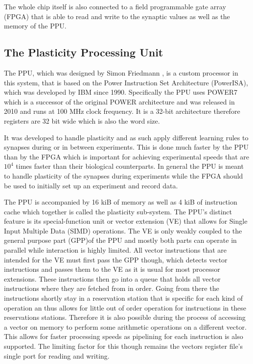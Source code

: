The whole chip itself is also connected to a field programmable gate array (FPGA) that is able to read and write to the synaptic values as well as the memory of the PPU.

\subsection{The Plasticity Processing Unit}
The PPU, which was designed by Simon Friedmann , is a custom processor in this system, that is based on the Power Instruction Set Architecture (PowerISA), which was developed by IBM since 1990. 
Specifically the PPU uses POWER7 which is a successor of the original POWER architecture and was released in 2010 and runs at 100 MHz clock frequency.
It is a 32-bit architecture therefore registers are 32 bit wide which is also the word size.

It was developed to handle plasticity and as such apply different learning rules to synapses during or in between experiments.
This is done much faster by the PPU than by the FPGA which is important for achieving experimental speeds that are $10^{4}$ times faster than their biological counterparts.
In general the PPU is meant to handle plasticity of the synapses during experiments while the FPGA should be used to initially set up an experiment and record data.

The PPU is accompanied by 16 kiB of memory as well as 4 kiB of instruction cache which together is called the plasticity sub-system.
The PPU's distinct feature is its special-function unit or vector extension (VE) that allows for Single Input Multiple Data (SIMD) operations.
The VE is only weakly coupled to the general purpose part (GPP)of the PPU and mostly both parts can operate in parallel while interaction is highly limited.
All vector instructions that are intended for the VE must first pass the GPP though, which detects vector instructions and passes them to the VE as it is usual for most processor extensions.
These instructions then go into a queue that holds all vector instructions where they are fetched from in order.
Going from there the instructions shortly stay in a reservation station that is specific for each kind of operation an thus allows for little out of order operation for instructions in these reservations stations.
Therefore it is also possible during the process of accessing a vector on memory to perform some arithmetic operations on a different vector.
This allows for faster processing speeds as pipelining for each instruction is also supported.
The limiting factor for this though remains the vectors register file's single port for reading and writing.

